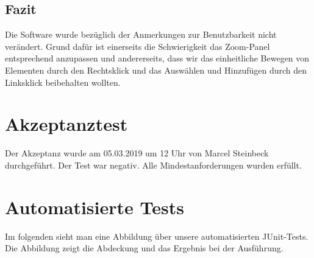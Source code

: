 \documentclass[enabledeprecatedfontcommands]{scrartcl}
\begin{document}
\subsection{Fazit}
Die Software wurde bezüglich der Anmerkungen zur Benutzbarkeit nicht verändert. Grund dafür ist einerseits die Schwierigkeit das Zoom-Panel entsprechend anzupassen und andererseits, dass wir das einheitliche Bewegen von Elementen durch den Rechtsklick und das Auswählen und  Hinzufügen durch den Linksklick beibehalten wollten.  

\section{Akzeptanztest}
Der Akzeptanz wurde am 05.03.2019 um 12 Uhr von Marcel Steinbeck durchgeführt. Der Test war negativ. Alle Mindestanforderungen wurden erfüllt. 

\newpage
\section{Automatisierte Tests}
Im folgenden sieht man eine Abbildung über unsere automatisierten JUnit-Tests.
Die Abbildung zeigt die Abdeckung und das Ergebnis bei der Ausführung.
\end{document}
